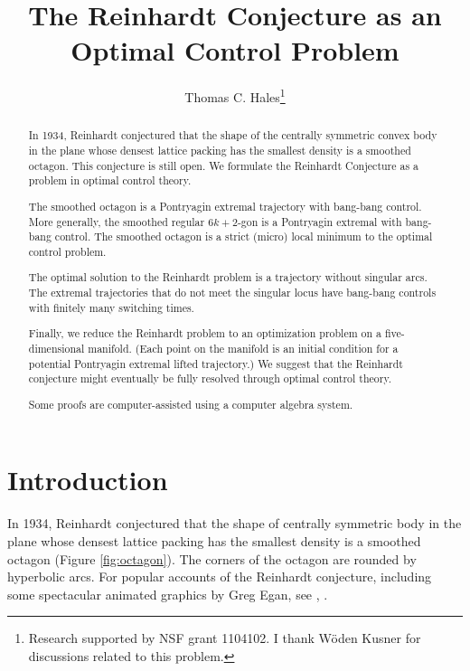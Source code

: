 \documentclass{article}
\title{The Reinhardt Conjecture as an Optimal Control Problem}
\author{Thomas C. Hales\thanks{Research supported by NSF grant
    1104102.  I thank W\"oden Kusner for discussions related to this
    problem.}}
\date{}
\theoremstyle{remark}
\begin{document}
\maketitle


\begin{abstract} 
  In 1934, Reinhardt conjectured that the shape of the centrally
  symmetric convex body in the plane whose densest lattice packing has
  the smallest density is a smoothed octagon.  This conjecture is
  still open.  We formulate the
  Reinhardt Conjecture as a problem in optimal control theory.

  The smoothed octagon is a Pontryagin extremal trajectory with
  bang-bang control.  More generally, the smoothed regular $6k+2$-gon
  is a Pontryagin extremal with bang-bang control.  The smoothed
  octagon is a strict (micro) local minimum to the optimal control
  problem.
  
  The optimal solution to the Reinhardt problem is a trajectory
  without singular arcs.  The extremal trajectories that do not meet
  the singular locus have bang-bang controls with finitely many
  switching times.

  Finally, we reduce the Reinhardt problem to an optimization problem
  on a five-dimensional manifold.  (Each point on the manifold is an
  initial condition for a potential Pontryagin extremal lifted
  trajectory.)  We suggest that the Reinhardt conjecture might
  eventually be fully resolved through optimal control theory.

  Some proofs are computer-assisted using a computer algebra system.
\end{abstract}

\baselineskip
{}\baselineskip

\newenvironment{blockquote}{%
  \par%
  \medskip%
  \baselineskip=0.7\baselineskip%
  \leftskip=2em\rightskip=2em%
  \noindent\ignorespaces}{%
  \par\medskip}

\section{Introduction}

In 1934, Reinhardt conjectured that the shape of centrally symmetric
body in the plane whose densest lattice packing has the smallest
density is a smoothed octagon (Figure \ref{fig:octagon}).  The
corners of the octagon are rounded by hyperbolic arcs.  For popular
accounts of the Reinhardt conjecture, including some spectacular
animated graphics by Greg Egan, see \cite{baez-egan}, \cite{baez}.
\end{document}
